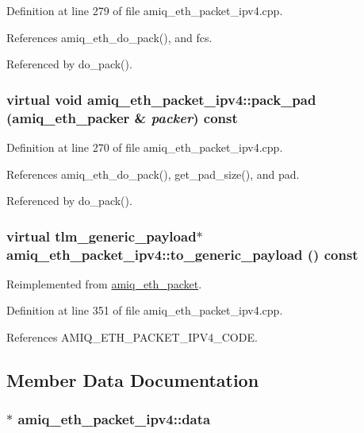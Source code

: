Definition at line 279 of file amiq\_\-eth\_\-packet\_\-ipv4.cpp.

References amiq\_\-eth\_\-do\_\-pack(), and fcs.

Referenced by do\_\-pack().\hypertarget{classamiq__eth__packet__ipv4_a5f525dd46092d237056f2c27901467f8}{
\subsubsection[{pack\_\-pad}]{\setlength{\rightskip}{0pt plus 5cm}virtual void amiq\_\-eth\_\-packet\_\-ipv4::pack\_\-pad ({\bf amiq\_\-eth\_\-packer} \& {\em packer}) const}}
\label{classamiq__eth__packet__ipv4_a5f525dd46092d237056f2c27901467f8}


Definition at line 270 of file amiq\_\-eth\_\-packet\_\-ipv4.cpp.

References amiq\_\-eth\_\-do\_\-pack(), get\_\-pad\_\-size(), and pad.

Referenced by do\_\-pack().\hypertarget{classamiq__eth__packet__ipv4_aefadeb6546366f09657c03790fe4ce90}{
\subsubsection[{to\_\-generic\_\-payload}]{\setlength{\rightskip}{0pt plus 5cm}virtual tlm\_\-generic\_\-payload$\ast$ amiq\_\-eth\_\-packet\_\-ipv4::to\_\-generic\_\-payload () const}}
\label{classamiq__eth__packet__ipv4_aefadeb6546366f09657c03790fe4ce90}


Reimplemented from \hyperlink{classamiq__eth__packet_a6dd92751d8172eeaa347d71bb415b0d5}{amiq\_\-eth\_\-packet}.

Definition at line 351 of file amiq\_\-eth\_\-packet\_\-ipv4.cpp.

References AMIQ\_\-ETH\_\-PACKET\_\-IPV4\_\-CODE.

\subsection{Member Data Documentation}
\hypertarget{classamiq__eth__packet__ipv4_aeed97aa2e747b98e424e7333be15c736}{
\subsubsection[{data}]{$\ast$ {\bf amiq\_\-eth\_\-packet\_\-ipv4::data}}}
\label{classamiq__eth__packet__ipv4_aeed97aa2e747b98e424e7333be15c736}


